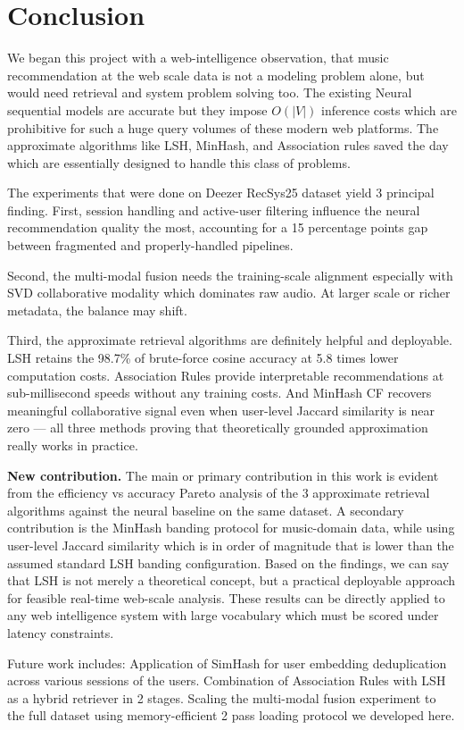 \documentclass[conference]{IEEEtran}
\begin{document}
\section{Conclusion}

We began this project with a web-intelligence observation, that music
recommendation at the web scale data is not a modeling problem alone, but
would need retrieval and system problem solving too. The existing Neural
sequential models are accurate but they impose $O(|V|)$ inference costs which
are prohibitive for such a huge query volumes of these modern web platforms.
The approximate algorithms like LSH, MinHash, and Association rules saved the
day which are essentially designed to handle this class of problems.

The experiments that were done on Deezer RecSys25 dataset yield 3 principal
finding. First, session handling and active-user filtering influence the neural
recommendation quality the most, accounting for a 15 percentage points gap
between fragmented and properly-handled pipelines.

Second, the multi-modal fusion needs the training-scale alignment especially
with SVD collaborative modality which dominates raw audio. At larger scale or
richer metadata, the balance may shift.

Third, the approximate retrieval algorithms are definitely helpful and
deployable. LSH retains the 98.7\% of brute-force cosine accuracy at 5.8
times lower computation costs. Association Rules provide interpretable
recommendations at sub-millisecond speeds without any training costs. And
MinHash CF recovers meaningful collaborative signal even when user-level
Jaccard similarity is near zero --- all three methods proving that
theoretically grounded approximation really works in practice.

\textbf{New contribution.}
The main or primary contribution in this work is evident from the efficiency
vs accuracy Pareto analysis of the 3 approximate retrieval algorithms against
the neural baseline on the same dataset. A secondary contribution is the
MinHash banding protocol for music-domain data, while using user-level Jaccard
similarity which is in order of magnitude that is lower than the assumed
standard LSH banding configuration. Based on the findings, we can say that
LSH is not merely a theoretical concept, but a practical deployable approach
for feasible real-time web-scale analysis. These results can be directly
applied to any web intelligence system with large vocabulary which must be
scored under latency constraints.

Future work includes: Application of SimHash for user embedding deduplication
across various sessions of the users. Combination of Association Rules with
LSH as a hybrid retriever in 2 stages. Scaling the multi-modal fusion
experiment to the full dataset using memory-efficient 2 pass loading protocol
we developed here.



\end{document}
